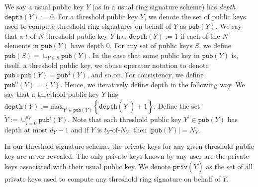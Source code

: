 \documentclass[12pt,english,oneside]{mrl}
\theoremstyle{definition}
\numberwithin{equation}{section}
\numberwithin{figure}{section}
\numberwithin{equation}{section}
\numberwithin{equation}{section}
\numberwithin{figure}{section}
\begin{document}
We say a usual public key $Y$ (as in a usual ring signature scheme) has \textit{depth} $\texttt{depth}(Y):=0$. For a threshold public key $Y$, we denote the set of public keys used to compute threshold ring signatures on behalf of $Y$ as $\texttt{pub}(Y)$. We say that a $t$-of-$N$ threshold public key $Y$ has $\texttt{depth}(Y):=1$ if each of the $N$ elements in $\texttt{pub}(Y)$ have depth $0$. For any set of public keys $S$, we define $\texttt{pub}\left(S\right) = \cup_{Y \in S} \texttt{pub}(Y)$. In the case that some public key in $\texttt{pub}(Y)$ is, itself, a threshold public key, we abuse operator notation to denote  $\texttt{pub}\circ\texttt{pub}(Y) = \texttt{pub}^2(Y)$, and so on. For consistency, we define $\texttt{pub}^0(Y) = \left\{Y\right\}$.  Hence, we iteratively define depth in the following way. We say that a threshold public key $Y$ has $\texttt{depth}(Y):=\text{max}_{Y^{\prime} \in \texttt{pub}(Y)}\left\{\texttt{depth}(Y^{\prime}) +1\right\}$. Define the set $\tilde{Y}:= \cup_{i=0}^{d_Y}\texttt{pub}^{i}(Y)$. Note that each threshold public key $Y^{\prime} \in \texttt{pub}(Y)$ has depth at most $d_Y - 1$ and if $Y$ is $t_Y$-of-$N_Y$, then $\left|\texttt{pub}(Y)\right| = N_Y$. 


In our threshold signature scheme, the private keys for any given threshold public key are never revealed. The only private keys known by any user are the private keys associated with their usual public key. We denote $\texttt{priv}(\tilde{Y})$ as the set of all private keys used to compute any threshold ring signature on behalf of $Y$.
\end{document}
